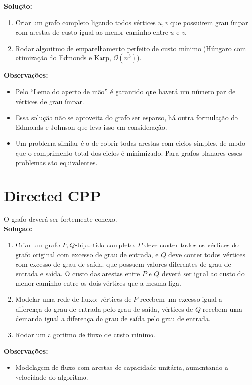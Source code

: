 \documentclass{article}
\begin{document}
\textbf{Solução:} 
\begin{enumerate}
    \item Criar um grafo completo ligando todos vértices $u, v$ que possuirem grau ímpar com arestas de custo igual ao menor caminho entre $u$ e $v$. 
    \item Rodar algoritmo de emparelhamento perfeito de custo mínimo (Húngaro com otimização do Edmonds e Karp, $\mathcal{O}(n^3)$).
\end{enumerate}


\textbf{Observações:}
\begin{itemize}
		\item Pelo ``Lema do aperto de mão'' é garantido que haverá um número par de vértices de grau ímpar.
		\item Essa solução não se aproveita do grafo ser esparso, há outra formulação do Edmonds e Johnson que leva isso em consideração.
		\item Um problema similar é o de cobrir todas arestas com ciclos simples, de modo que o comprimento total dos ciclos é minimizado. Para grafos planares esses problemas são equivalentes.
	\end{itemize}

	\section{Directed CPP}

	O grafo deverá ser fortemente conexo.\\

	\textbf{Solução:}
	\begin{enumerate}
		\item Criar um grafo $P, Q$-bipartido completo. $P$ deve conter todos os vértices do grafo original com excesso de grau de entrada, e $Q$ deve conter todos vértices com excesso de grau de saída. que possuem valores diferentes de grau de entrada e saída. O custo das arestas entre $P$ e $Q$ deverá ser igual ao custo do menor caminho entre os dois vértices que a mesma liga.
		\item Modelar uma rede de fluxo: vértices de $P$ recebem um excesso igual a diferença do grau de entrada pelo grau de saída, vértices de $Q$ recebem uma demanda igual a diferença do grau de saída pelo grau de entrada. 
		\item Rodar um algoritmo de fluxo de custo mínimo. 
	\end{enumerate}

	\textbf{Observações:}
	\begin{itemize}
		\item Modelagem de fluxo com arestas de capacidade unitária, aumentando a velocidade do algoritmo.
	\end{itemize}
\end{document}
